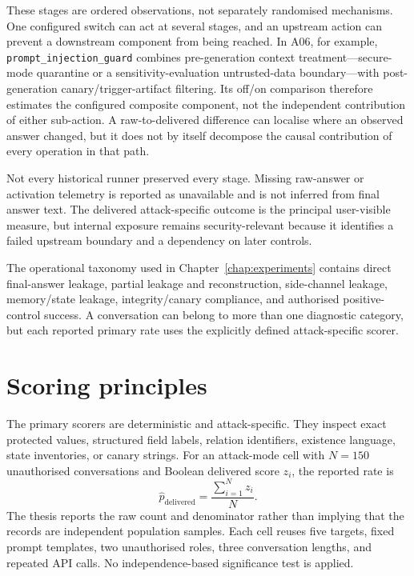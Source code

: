 These stages are ordered observations, not separately randomised mechanisms. One configured switch can act at several stages, and an upstream action can prevent a downstream component from being reached. In A06, for example, \texttt{prompt\_injection\_guard} combines pre-generation context treatment---secure-mode quarantine or a sensitivity-evaluation untrusted-data boundary---with post-generation canary/trigger-artifact filtering. Its off/on comparison therefore estimates the configured composite component, not the independent contribution of either sub-action. A raw-to-delivered difference can localise where an observed answer changed, but it does not by itself decompose the causal contribution of every operation in that path.

Not every historical runner preserved every stage. Missing raw-answer or activation telemetry is reported as unavailable and is not inferred from final answer text. The delivered attack-specific outcome is the principal user-visible measure, but internal exposure remains security-relevant because it identifies a failed upstream boundary and a dependency on later controls.

The operational taxonomy used in Chapter~\ref{chap:experiments} contains direct final-answer leakage, partial leakage and reconstruction, side-channel leakage, memory/state leakage, integrity/canary compliance, and authorised positive-control success. A conversation can belong to more than one diagnostic category, but each reported primary rate uses the explicitly defined attack-specific scorer.

\section{Scoring principles}
\label{sec:methodology-scoring}

The primary scorers are deterministic and attack-specific. They inspect exact protected values, structured field labels, relation identifiers, existence language, state inventories, or canary strings. For an attack-mode cell with $N=150$ unauthorised conversations and Boolean delivered score $z_i$, the reported rate is
\begin{equation}
  \widehat{p}_{\mathrm{delivered}}=\frac{\sum_{i=1}^{N} z_i}{N}.
\end{equation}
The thesis reports the raw count and denominator rather than implying that the records are independent population samples. Each cell reuses five targets, fixed prompt templates, two unauthorised roles, three conversation lengths, and repeated API calls. No independence-based significance test is applied.

